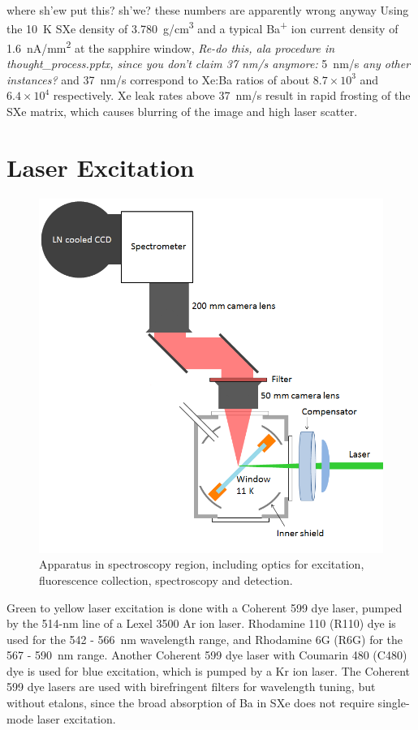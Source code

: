 
where sh'ew put this? sh'we?  these numbers are apparently wrong anyway   {\color{red}Using the 10~K SXe density of 3.780~g/cm\textsuperscript{3} \cite{SXeDensity} and a typical Ba\textsuperscript{+} ion current density of 1.6~nA/mm\textsuperscript{2} at the sapphire window, \emph{\color{gray}Re-do this, ala procedure in thought\_process.pptx, since you don't claim 37 nm/s anymore:} 5~nm/s \emph{\color{gray}any other instances?} and 37~nm/s correspond to Xe:Ba ratios of about $8.7 \times 10^{3}$ and $6.4 \times 10^{4}$ respectively.  Xe leak rates above 37~nm/s result in rapid frosting of the SXe matrix, which causes blurring of the image and high laser scatter.}

\section{Laser Excitation}

\begin{figure} %
        \centering
                \includegraphics[width=.7\textwidth]{figures/window_etc_justOptics.png}
                \caption{Apparatus in spectroscopy region, including optics for excitation, fluorescence collection, spectroscopy and detection.}
\label{fig:endOfBeamOptics}
\end{figure}

Green to yellow laser excitation is done with a Coherent 599 dye laser, pumped by the 514-nm line of a Lexel 3500 Ar ion laser.  Rhodamine 110 (R110) dye is used for the 542 - 566~nm wavelength range, and Rhodamine 6G (R6G) for the 567 - 590~nm range.  Another Coherent 599 dye laser with Coumarin 480 (C480) dye is used for blue excitation, which is pumped by a Kr ion laser.  The Coherent 599 dye lasers are used with birefringent filters for wavelength tuning, but without etalons, since the broad absorption of Ba in SXe does not require single-mode laser excitation.

